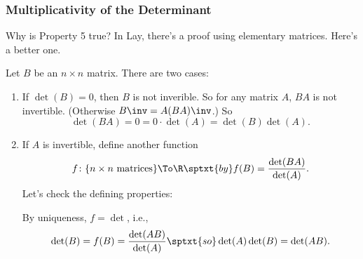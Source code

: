\begin{frame}
\frametitle{Multiplicativity of the Determinant}

Why is \alert{Property 5} true?
\pause
In Lay, there's a proof using elementary matrices.
\pause
Here's a better one.

\medskip
\begin{webonly}
Let $B$ be an $n\times n$ matrix.  There are two cases:
\begin{enumerate}
\item If $\det(B) = 0$, then $B$ is not inverible.
  So for any matrix $A$, $BA$ is not invertible. (Otherwise $B\inv =
  A(BA)\inv$.) So 
  \[ \det(BA) = 0 = 0\cdot\det(A) =  \det(B)\det(A). \]

\item If $A$ is invertible, define another function
  \displayskips{3pt}
  \[ f\colon\{\text{$n\times n$ matrices}\}\To\R
  \sptxt{by} f(B) = \frac{\det(BA)}{\det(A)}. \]
  Let's check the defining properties:\\[.5mm]
  By uniqueness, $f = \det$, i.e.,
  \[ \det(B) = f(B) = \frac{\det(AB)}{\det(A)}
  \sptxt{so}
  \det(A)\det(B) = \det(AB).
  \]

\end{enumerate}
\end{webonly}

\end{frame}



\def\curvy{(-37.3333, 2.6667)
     .. controls (-37.3333, -5.3333) and (-26.6667, -10.6667) .. (-16, -24)
     .. controls (-5.3333, -37.3333) and (5.3333, -58.6667) .. (18.6667, -48)
     .. controls (32, -37.3333) and (48, 5.3333) .. (45.3333, 18.6667)
     .. controls (42.6667, 32) and (21.3333, 16) .. (8, 13.3333)
     .. controls (-5.3333, 10.6667) and (-10.6667, 21.3333) .. (-18.6667, 21.3333)
     .. controls (-26.6667, 21.3333) and (-37.3333, 10.6667) .. cycle}


